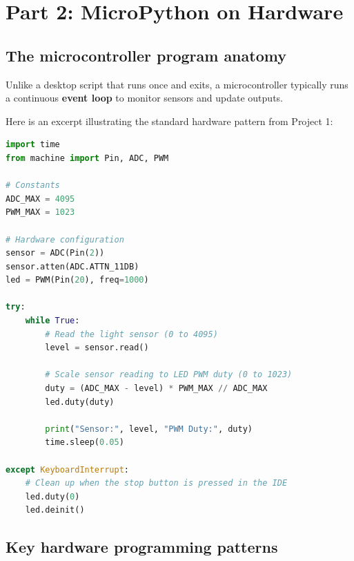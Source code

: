 \section{Part 2: MicroPython on Hardware}

\subsection{The microcontroller program anatomy}
Unlike a desktop script that runs once and exits, a microcontroller typically runs a continuous
\textbf{event loop} to monitor sensors and update outputs.

Here is an excerpt illustrating the standard hardware pattern from Project 1:

\begin{lstlisting}[language=Python,caption=A typical MicroPython hardware script]
import time
from machine import Pin, ADC, PWM

# Constants
ADC_MAX = 4095
PWM_MAX = 1023

# Hardware configuration
sensor = ADC(Pin(2))
sensor.atten(ADC.ATTN_11DB)
led = PWM(Pin(20), freq=1000)

try:
    while True:
        # Read the light sensor (0 to 4095)
        level = sensor.read()

        # Scale sensor reading to LED PWM duty (0 to 1023)
        duty = (ADC_MAX - level) * PWM_MAX // ADC_MAX
        led.duty(duty)

        print("Sensor:", level, "PWM Duty:", duty)
        time.sleep(0.05)

except KeyboardInterrupt:
    # Clean up when the stop button is pressed in the IDE
    led.duty(0)
    led.deinit()
\end{lstlisting}

\subsection{Key hardware programming patterns}

